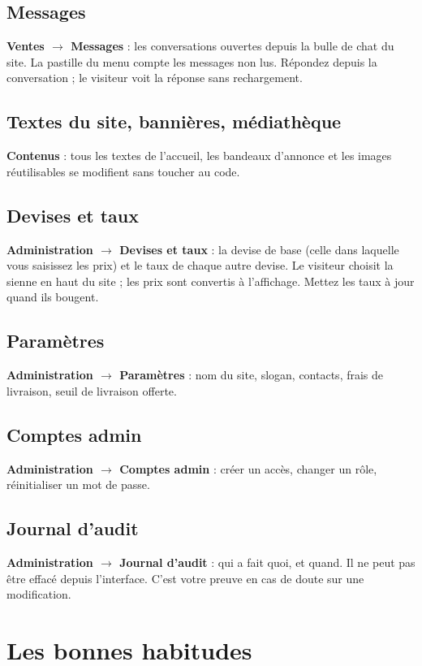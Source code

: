 \documentclass[11pt,a4paper]{article}
\newcommand{\menu}[1]{\textsf{\textbf{#1}}}
\begin{document}
\subsection{Messages}
\menu{Ventes $\rightarrow$ Messages} : les conversations ouvertes depuis la
bulle de chat du site. La pastille du menu compte les messages non lus.
Répondez depuis la conversation ; le visiteur voit la réponse sans rechargement.

\subsection{Textes du site, bannières, médiathèque}
\menu{Contenus} : tous les textes de l'accueil, les bandeaux d'annonce et les
images réutilisables se modifient sans toucher au code.

\subsection{Devises et taux}
\menu{Administration $\rightarrow$ Devises et taux} : la devise de base (celle
dans laquelle vous saisissez les prix) et le taux de chaque autre devise. Le
visiteur choisit la sienne en haut du site ; les prix sont convertis à
l'affichage. Mettez les taux à jour quand ils bougent.

\subsection{Paramètres}
\menu{Administration $\rightarrow$ Paramètres} : nom du site, slogan, contacts,
frais de livraison, seuil de livraison offerte.

\subsection{Comptes admin}
\menu{Administration $\rightarrow$ Comptes admin} : créer un accès, changer un
rôle, réinitialiser un mot de passe.

\subsection{Journal d'audit}
\menu{Administration $\rightarrow$ Journal d'audit} : qui a fait quoi, et quand.
Il ne peut pas être effacé depuis l'interface. C'est votre preuve en cas de
doute sur une modification.

\section{Les bonnes habitudes}
\end{document}
